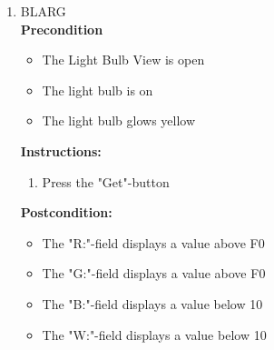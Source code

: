\documentclass[a4paper]{article}
\newlength{\testlabellength}
\newenvironment{testlist}{\begin{enumerate}[label=\bfseries Instruction \thesubsection.\arabic* , labelindent=0pt, labelwidth=\testlabellength , leftmargin=2cm]}{\end{enumerate}}
\newenvironment{precondition}{
{\color{white}BLARG}\\ 
\textbf{Precondition}
\begin{itemize}[labelindent=0cm, labelwidth=2cm , leftmargin=1cm]
}
{\end{itemize}}
\newenvironment{instruction}{
\textbf{Instructions:}
\begin{enumerate}[label=\bfseries  \arabic*., labelindent=0cm, labelwidth=2cm , leftmargin=1cm]
}
{\end{enumerate}}
\newenvironment{postcondition}{
\textbf{Postcondition:}
\begin{itemize}[labelindent=0cm, labelwidth=2cm , leftmargin=1cm]
}
{\end{itemize}}
\begin{document}
\begin{appendices}
\begin{testlist}
\begin{precondition}
			\begin{itemize}
				\item The "R:"-field of the light bulb is set to FF
				\item The "G:"-field of the light bulb is set to FF
				\item The "B:"-field of the light bulb is set to 00
				\item The "W:"-field of the light bulb is set to 00
			\end{itemize}
		\end{precondition}
		\begin{instruction}
			\item Set the "R:"-field to FF
			\item Set the "G:"-field to 00
			\item Set the "B:"-field to 00
			\item Set the "W:"-field to 00
			\item Press the "Set"-button
		\end{instruction}
		\begin{postcondition}
			\item The light bulb glows red
		\end{postcondition}

	\item
		\begin{precondition}
			\item The Light Bulb View is open
			\item The light bulb is on
			\item The light bulb glows yellow
		\end{precondition}
		\begin{instruction}
			\item Press the "Get"-button
		\end{instruction}
		\begin{postcondition}
			\item The "R:"-field displays a value above F0
			\item The "G:"-field displays a value above F0
			\item The "B:"-field displays a value below 10
			\item The "W:"-field displays a value below 10
		\end{postcondition}


\end{testlist}
\end{appendices}
\end{document}
